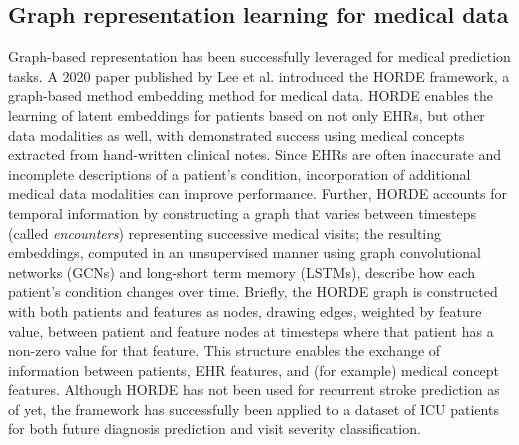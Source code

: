 \documentclass{article}
\begin{document}
\subsection{Graph representation learning for medical data}
Graph-based representation has been successfully leveraged for medical prediction tasks. A 2020 paper published by Lee et al. introduced the HORDE framework, a graph-based method embedding method for medical data. HORDE enables the learning of latent embeddings for patients based on not only EHRs, but other data modalities as well, with demonstrated success using medical concepts extracted from hand-written clinical notes. Since EHRs are often inaccurate and incomplete descriptions of a patient's condition, incorporation of additional medical data modalities can improve performance. Further, HORDE accounts for temporal information by constructing a graph that varies between timesteps (called \textit{encounters}) representing successive medical visits; the resulting embeddings, computed in an unsupervised manner using graph convolutional networks (GCNs) and long-short term memory (LSTMs), describe how each patient's condition changes over time. Briefly, the HORDE graph is constructed with both patients and features as nodes, drawing edges, weighted by feature value, between patient and feature nodes at timesteps where that patient has a non-zero value for that feature. This structure enables the exchange of information between patients, EHR features, and (for example) medical concept features. Although HORDE has not been used for recurrent stroke prediction as of yet, the framework has successfully been applied to a dataset of ICU patients for both future diagnosis prediction and visit severity classification.

\end{document}
